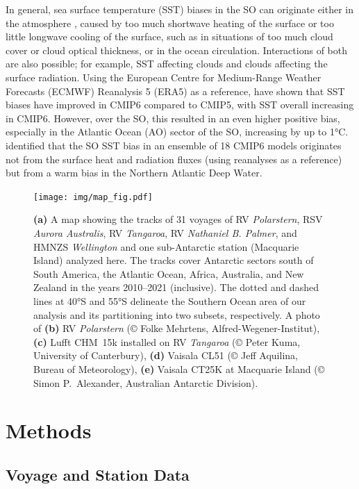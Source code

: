 \documentclass[draft]{agujournal2019}
\begin{document}
In general, sea surface temperature (SST) biases in the SO can originate either in the atmosphere \cite{hyder2018}, caused by too much shortwave heating of the surface or too little longwave cooling of the surface, such as in situations of too much cloud cover or cloud optical thickness, or in the ocean circulation. Interactions of both are also possible; for example, SST affecting clouds and clouds affecting the surface radiation. Using the European Centre for Medium-Range Weather Forecasts (ECMWF) Reanalysis 5 (ERA5) as a reference,  have shown that SST biases have improved in CMIP6 compared to CMIP5, with SST overall increasing in CMIP6. However, over the SO, this resulted in an even higher positive bias, especially in the Atlantic Ocean (AO) sector of the SO, increasing by up to 1°C.  identified that the SO SST bias in an ensemble of 18 CMIP6 models originates not from the surface heat and radiation fluxes (using reanalyses as a reference) but from a warm bias in the Northern Atlantic Deep Water.

\begin{figure}[b!]
\centering
\texttt{[image: img/map\_fig.pdf]}
\caption{
\textbf{(a)} A map showing the tracks of 31 voyages of RV \emph{Polarstern}, RSV \emph{Aurora Australis}, RV \emph{Tangaroa}, RV \emph{Nathaniel B. Palmer}, and HMNZS \emph{Wellington} and one sub-Antarctic station (Macquarie Island) analyzed here. The tracks cover Antarctic sectors south of South America, the Atlantic Ocean, Africa, Australia, and New Zealand in the years 2010--2021 (inclusive). The dotted and dashed lines at 40°S and 55°S delineate the Southern Ocean area of our analysis and its partitioning into two subsets, respectively. A photo of \textbf{(b)} RV \emph{Polarstern} (© Folke Mehrtens, Alfred-Wegener-Institut), \textbf{(c)} Lufft CHM~15k installed on RV \emph{Tangaroa} (© Peter Kuma, University of Canterbury), \textbf{(d)} Vaisala CL51 (© Jeff Aquilina, Bureau of Meteorology), \textbf{(e)} Vaisala CT25K at Macquarie Island (© Simon P.\ Alexander, Australian Antarctic Division).
}
\label{fig:map}
\end{figure}

\section{Methods}
\label{sec:methods}

\subsection{Voyage and Station Data}
\label{sec:voyage-and-station-data}
\end{document}
